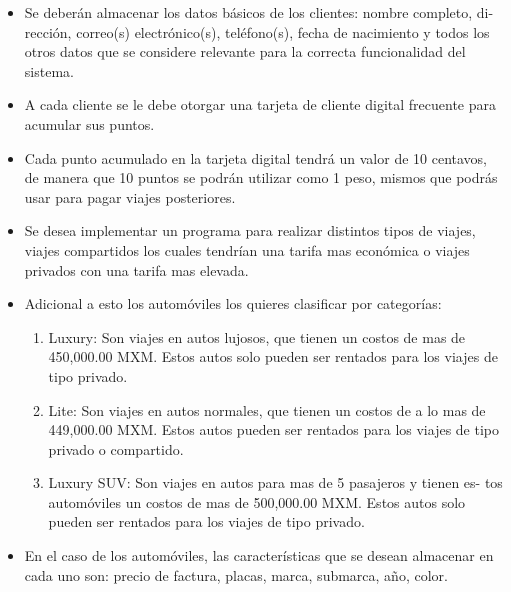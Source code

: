 \documentclass{article}
\begin{document}
       {\begin{itemize}
           \item Se deberán almacenar los datos básicos de los clientes: nombre completo, di-
             rección, correo(s) electrónico(s), teléfono(s), fecha de nacimiento y todos los
             otros datos que se considere relevante para la correcta funcionalidad del sistema.
           
           \item A cada cliente se le debe otorgar una tarjeta de cliente digital frecuente para
             acumular sus puntos.
             
           \item Cada punto acumulado en la tarjeta digital tendrá un valor de 10 centavos, de
             manera que 10 puntos se podrán utilizar como 1 peso, mismos que podrás usar
             para pagar viajes posteriores.
             
           \item Se desea implementar un programa para realizar distintos tipos de viajes, viajes
             compartidos los cuales tendrían una tarifa mas económica o viajes privados
             con una tarifa mas elevada.
             
           \item Adicional a esto los automóviles los quieres clasificar por categorías:
             \begin{enumerate}
             \item Luxury: Son viajes en autos lujosos, que tienen un costos de mas de 450,000.00
               MXM. Estos autos solo pueden ser rentados para los viajes de tipo privado.
             \item Lite: Son viajes en autos normales, que tienen un costos de a lo mas de
               449,000.00 MXM. Estos autos pueden ser rentados para los viajes de tipo
               privado o compartido.
             \item Luxury SUV: Son viajes en autos para mas de 5 pasajeros y tienen es-
               tos automóviles un costos de mas de 500,000.00 MXM. Estos autos solo
               pueden ser rentados para los viajes de tipo privado.
             \end{enumerate}

           \item En el caso de los automóviles, las características que se desean almacenar en
             cada uno son: precio de factura, placas, marca, submarca, año, color.


\end{itemize}}
\end{document}
